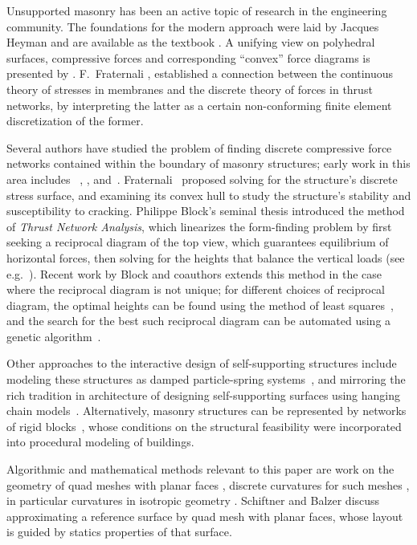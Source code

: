 \documentclass[review]{acmsiggraph}
\begin{document}
Unsupported masonry has been an active topic of research in the 
engineering community. The foundations for the modern approach were laid 
by Jacques Heyman  and are available as the textbook 
\cite{Heyman95}. A unifying view on polyhedral surfaces, compressive 
forces and corresponding ``convex'' force diagrams is presented by 
\cite{Ash1988}. F.~Fraternali , 
 established a connection between the continuous 
theory of stresses in membranes and the discrete theory of forces in 
thrust networks, by interpreting the latter as a certain non-conforming 
finite element discretization of the former.

Several authors have studied the problem of finding discrete compressive 
force networks contained within the boundary of masonry structures; early 
work in this area includes \ \cite{schek74}, \cite{Livesley92}, and\ 
\cite{O'Dwyer98}. Fraternali~ proposed solving 
for the structure's discrete stress surface, and examining its convex hull 
to study the structure's stability and susceptibility to cracking. 
Philippe Block's seminal thesis introduced the method of {\it Thrust 
Network Analysis}, which linearizes the form-finding problem by first 
seeking a reciprocal diagram of the top view, which guarantees equilibrium 
of horizontal forces, then solving for the heights that balance the 
vertical loads (see e.g.\ \cite{Block07,block09}). Recent work by Block 
and coauthors extends this method in the case where the reciprocal diagram 
is not unique; for different choices of reciprocal diagram, the optimal 
heights can be found using the method of least squares~\cite{vanmele2011}, 
and the search for the best such reciprocal diagram can be automated using 
a genetic algorithm~\cite{Block2011}.

Other approaches to the interactive design of self-supporting structures 
include modeling these structures as damped particle-spring 
systems~\cite{Kilian2005,barnes09}, and mirroring the rich tradition in 
architecture of designing self-supporting surfaces using hanging chain 
models~\cite{Heyman98}. Alternatively, masonry structures can be 
represented by networks of rigid blocks~\cite{Whiting09}, whose conditions 
on the structural feasibility were incorporated into procedural modeling 
of buildings.

Algorithmic and mathematical methods relevant to this paper are work on 
the geometry of quad meshes with planar faces \cite{Glymph2004,Liu2006}, 
discrete curvatures for such meshes \cite{Pottmann2007b,bobenko-2010-ct}, 
in particular curvatures in isotropic geometry \cite{Pottmann2007}. 
Schiftner and Balzer \shortcite{Schiftner2010} discuss approximating a 
reference surface by quad mesh with planar faces, whose layout is guided 
by statics properties of that surface.
\end{document}
